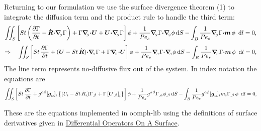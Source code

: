 Returning to our formulation we use the surface divergence theorem (1) to integrate the diffusion term and the product rule to handle the third term\+: \[ \int\!\!\!\int_{S} \left[ St \left(\frac{\partial \Gamma}{\partial t} - \dot{\mbox{\boldmath$R$}} \mbox{\boldmath$\cdot$} \mbox{\boldmath$\nabla$}_{\!\!_{S}} \Gamma \right) + \Gamma \mbox{\boldmath$\nabla$}_{\!\!_{S}} \mbox{\boldmath$\cdot$} \mbox{\boldmath$U$} + \mbox{\boldmath$U$} \mbox{\boldmath$\cdot$} \mbox{\boldmath$\nabla$}_{\!\!_{S}} \Gamma \right] \phi + \frac{1}{Pe_{s}} \mbox{\boldmath$\nabla$}_{\!\!_{S}} \Gamma \mbox{\boldmath$\cdot$} \mbox{\boldmath$\nabla$}_{\!\!_{S}} \phi\, \mbox{d}S - \int_{B} \frac{1}{Pe_{s}} \mbox{\boldmath$\nabla$}_{\!\!_{S}} \Gamma \mbox{\boldmath$\cdot m$}\, \phi \,\mbox{ d} l = 0,\] \[ \Rightarrow \quad \int\!\!\!\int_{S} \left[ St\, \frac{\partial \Gamma}{\partial t} + (\mbox{\boldmath$U$} - St\, \dot{\mbox{\boldmath$R$}}) \mbox{\boldmath$\cdot$} \mbox{\boldmath$\nabla$}_{\!\!_{S}} \Gamma + \Gamma \mbox{\boldmath$\nabla$}_{\!\!_{S}} \mbox{\boldmath$\cdot$} \mbox{\boldmath$U$} \right] \phi + \frac{1}{Pe_{s}} \mbox{\boldmath$\nabla$}_{\!\!_{S}} \Gamma \mbox{\boldmath$\cdot$} \mbox{\boldmath$\nabla$}_{\!\!_{S}} \phi\, \mbox{d}S - \int_{B} \frac{1}{Pe_{s}} \mbox{\boldmath$\nabla$}_{\!\!_{S}} \Gamma \mbox{\boldmath$\cdot m$}\, \phi \,\mbox{ d} l = 0,\] The line term represents no-\/diffusive flux out of the system. In index notation the equations are \[ \int\!\!\!\int_{S} \left[ St\, \frac{\partial \Gamma}{\partial t} + g^{\alpha\beta} [\mbox{\boldmath$g$}_{\alpha}]_{i}\left\{ (U_{i} - St\, \dot{R}_{i}) \Gamma_{,\beta} + \Gamma \left[\mbox{\boldmath$U$}_{,\beta}\right]_{i}\right\} \right] \phi + \frac{1}{Pe_{s}} g^{\alpha\beta} \Gamma_{,\alpha} \phi_{,\beta}\, \mbox{d}S - \int_{B} \frac{1}{Pe_{s}} g^{\alpha\beta} [\mbox{\boldmath$g$}_{\alpha}]_{i} m_{i} \Gamma_{,\beta}\, \phi \,\mbox{ d} l = 0,\]

These are the equations implemented in {\ttfamily oomph-\/lib} using the definitions of surface derivatives given in \hyperlink{index_surface_gradient}{Differential Operators On A Surface}.



 

